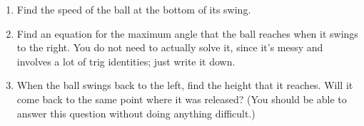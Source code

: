 \documentclass[12pt]{article}
\begin{document}
\begin{enumerate}
     \begin{enumerate}
       \item{Find the speed of the ball at the bottom of its swing.}
\vspace{2in}

       \item{Find an equation for the maximum angle that the ball reaches when it swings to the right. You do not need to actually solve it, since it's messy and involves a lot of trig identities; just write it down.}

\vspace{2in}

       \item{When the ball swings back to the left, find the height that it reaches. Will it come
         back to the same point where it was released? (You should be able to answer this question without doing anything difficult.)}
     \end{enumerate}
 \end{enumerate}
 
\end{document}
